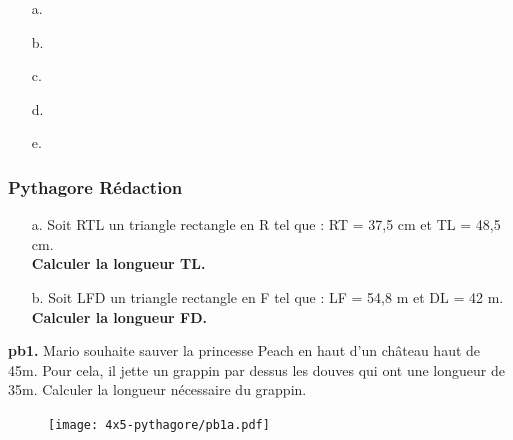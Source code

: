 \begin{multicols}{5}
  \begin{enumerate}
  \item[a.] \dotfill \\ \Pointilles[1]
  \item[b.] \dotfill \\ \Pointilles[1]
  \item[c.] \dotfill \\ \Pointilles[1]
  \item[d.] \dotfill \\ \Pointilles[1]
  \item[e.] \dotfill \\ \Pointilles[1]
  \end{enumerate}
\end{multicols}


\subsubsection*{Pythagore Rédaction}

\begin{multicols}{2}
\begin{enumerate}
  \item[a.]Soit RTL un triangle rectangle en R tel que : RT = 37,5 cm et TL = 48,5 cm. \\
  \textbf{Calculer la longueur TL.}

  \item[b.]Soit LFD un triangle rectangle en F tel que : LF = 54,8 m et DL = 42 m. \\
  \textbf{Calculer la longueur FD.}

\end{enumerate}
\end{multicols}

\Pointilles[13]

\begin{minipage}[t]{0.65\textwidth}
  \textbf{pb1.} Mario souhaite sauver la princesse Peach en haut d'un château haut de 45m. Pour cela, il jette un grappin par dessus les douves qui ont une longueur de 35m. Calculer la longueur nécessaire du grappin.
  
  \Pointilles[5]
  \end{minipage}
  \begin{minipage}[t]{0.35\textwidth}
  \begin{figure}[H]
    \centering
    \texttt{[image: 4x5-pythagore/pb1a.pdf]}
  \end{figure}
\end{minipage}

